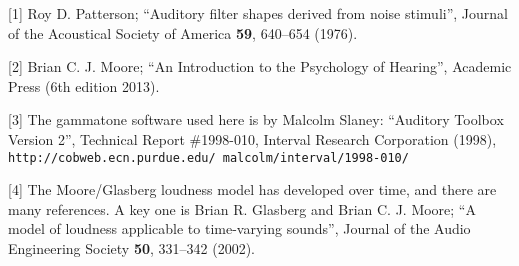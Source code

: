   \sectionreferences{}[1] Roy D. Patterson; ``Auditory filter shapes derived 
  from noise stimuli'', Journal of the Acoustical Society of America 
  \textbf{59}, 640--654 (1976). 

  [2] Brian C. J. Moore; ``An Introduction to the Psychology of Hearing'', 
  Academic Press (6th edition 2013). 

  [3] The gammatone software used here is by Malcolm Slaney: ``Auditory Toolbox 
  Version 2'', Technical Report \#1998-010, Interval Research Corporation 
  (1998), \tt{}http://cobweb.ecn.purdue.edu/~malcolm/interval/1998-010/\rm{} 

  [4] The Moore/Glasberg loudness model has developed over time, and there are 
  many references. A key one is Brian R. Glasberg and Brian C. J. Moore; “A 
  model of loudness applicable to time-varying sounds”, Journal of the Audio 
  Engineering Society \textbf{50}, 331--342 (2002). 